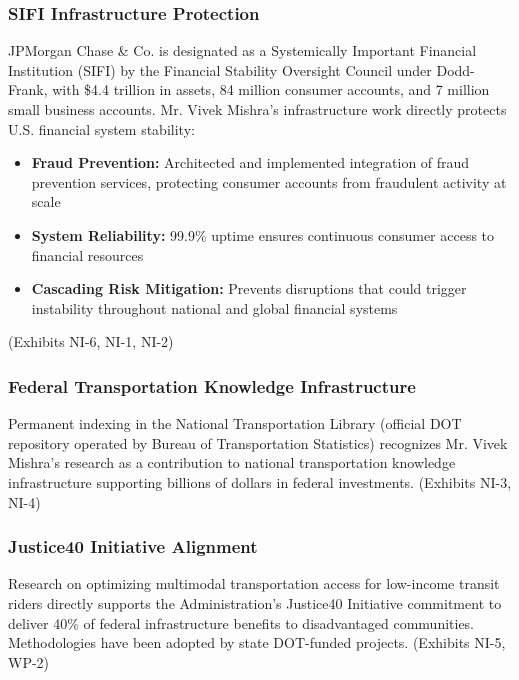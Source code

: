 \documentclass[11pt]{article}
\newcommand{\drs}{Mr. Vivek Mishra's }
\begin{document}
\subsubsection{SIFI Infrastructure Protection}

JPMorgan Chase \& Co. is designated as a Systemically Important Financial Institution (SIFI) by the Financial Stability Oversight Council under Dodd-Frank, with \$4.4 trillion in assets, 84 million consumer accounts, and 7 million small business accounts. \drs infrastructure work directly protects U.S. financial system stability:

\begin{itemize}
    \item \textbf{Fraud Prevention:} Architected and implemented integration of fraud prevention services, protecting consumer accounts from fraudulent activity at scale
    \item \textbf{System Reliability:} 99.9\% uptime ensures continuous consumer access to financial resources
    \item \textbf{Cascading Risk Mitigation:} Prevents disruptions that could trigger instability throughout national and global financial systems
\end{itemize}

(Exhibits NI-6, NI-1, NI-2)

\subsubsection{Federal Transportation Knowledge Infrastructure}

 Permanent indexing in the National Transportation Library (official DOT repository operated by Bureau of Transportation Statistics) recognizes \drs research as a contribution to national transportation knowledge infrastructure supporting billions of dollars in federal investments. (Exhibits NI-3, NI-4)

\subsubsection{Justice40 Initiative Alignment}

Research on optimizing multimodal transportation access for low-income transit riders directly supports the Administration's Justice40 Initiative commitment to deliver 40\% of federal infrastructure benefits to disadvantaged communities. Methodologies have been adopted by state DOT-funded projects. (Exhibits NI-5, WP-2)
\end{document}
